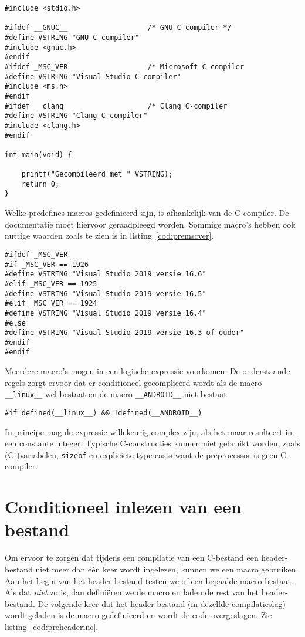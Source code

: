 \begin{lstlisting}[caption=Conditioneel inlezen van header-bestanden.,label=cod:precondinc]
#include <stdio.h>

#ifdef __GNUC__                   /* GNU C-compiler */
#define VSTRING "GNU C-compiler"
#include <gnuc.h>
#endif
#ifdef _MSC_VER                   /* Microsoft C-compiler
#define VSTRING "Visual Studio C-compiler"
#include <ms.h>
#endif
#ifdef __clang__                  /* Clang C-compiler
#define VSTRING "Clang C-compiler"
#include <clang.h>
#endif

int main(void) {

	printf("Gecompileerd met " VSTRING);
	return 0;
}

\end{lstlisting}

Welke predefines macros gedefinieerd zijn, is afhankelijk van de C-compiler. De documentatie moet hiervoor geraadpleegd worden. Sommige macro's hebben ook nuttige waarden zoals te zien is in listing~\ref{cod:premscver}.

\begin{lstlisting}[caption=Gebruik van de \texttt{\_MSC\_VER}-macro.,label=cod:premscver]
#ifdef _MSC_VER
#if _MSC_VER == 1926
#define VSTRING "Visual Studio 2019 versie 16.6"
#elif _MSC_VER == 1925
#define VSTRING "Visual Studio 2019 versie 16.5"
#elif _MSC_VER == 1924
#define VSTRING "Visual Studio 2019 versie 16.4"
#else
#define VSTRING "Visual Studio 2019 versie 16.3 of ouder"
#endif
#endif
\end{lstlisting}

Meerdere macro's mogen in een logische expressie voorkomen. De onderstaande regels zorgt ervoor dat er conditioneel gecomplieerd wordt als de macro \texttt{\_\_linux\_\_} wel bestaat en de macro \texttt{\_\_ANDROID\_\_} niet bestaat.

\hspace*{1em}\texttt{\#if defined(\_\_linux\_\_) \&\& !defined(\_\_ANDROID\_\_)}

In principe mag de expressie willekeurig complex zijn, als het maar resulteert in een constante integer. Typische C-constructies kunnen niet gebruikt worden, zoals (C-)variabelen, \texttt{sizeof} en expliciete type casts want de preprocessor is geen C-compiler.


\section{Conditioneel inlezen van een bestand}
\label{sec:conditioneelinlezen}
Om ervoor te zorgen dat tijdens een compilatie van een C-bestand een header-bestand niet meer dan één keer wordt ingelezen, kunnen we een macro gebruiken. Aan het begin van het header-bestand testen we of een bepaalde macro bestaat. Als dat \textsl{niet} zo is, dan definiëren we de macro en laden de rest van het header-bestand. De volgende keer dat het header-bestand (in dezelfde compilatieslag) wordt geladen is de macro gedefinieerd en wordt de code overgeslagen. Zie listing~\ref{cod:preheaderinc}.

